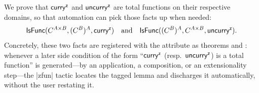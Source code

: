 We prove that $\mathop{\mathsf{\mathsf{curry}}^{\mathsf{z}}}$ and $\mathop{\mathsf{\mathsf{uncurry}}^{\mathsf{z}}}$ are total functions
on their respective domains, so that automation can pick those facts up when needed:
\[
  \mathsf{IsFunc}(C^{A \times B}, (C^B)^A, \mathop{\mathsf{\mathsf{curry}}^{\mathsf{z}}}) \quad\text{and}\quad \mathsf{IsFunc}((C^B)^A, C^{A \times B}, \mathop{\mathsf{\mathsf{uncurry}}^{\mathsf{z}}}).
\]
Concretely, these two facts are registered with the  attribute as theorems {\small{}} and {\small{}}: whenever a later side condition of the form ``$\mathop{\mathsf{\mathsf{curry}}^{\mathsf{z}}}$ (resp.\ $\mathop{\mathsf{\mathsf{uncurry}}^{\mathsf{z}}}$) is a total function'' is generated---by an application, a composition, or an extensionality step---the \inlinelean|zfun| tactic locates the tagged lemma and discharges it automatically, without the user restating it.

